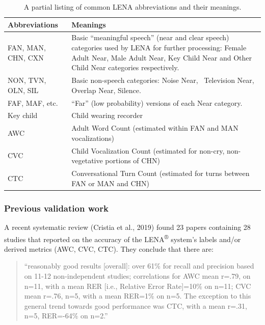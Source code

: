 \documentclass[english,table,man,floatsintext]{apa6}
\begin{document}
\begin{table}

\caption{\label{tab:tab-abb}A partial listing of common LENA abbreviations and their meanings.}
\centering
\begin{tabular}[t]{>{\raggedright\arraybackslash}p{12em}>{\raggedright\arraybackslash}p{28em}}
\toprule
Abbreviations & Meanings\\
\midrule
FAN, MAN, CHN, CXN & Basic “meaningful speech” (near and clear speech) categories used by LENA for further processing: Female Adult Near, Male Adult Near, Key Child Near and Other Child Near categories respectively.\\
NON, TVN, OLN, SIL & Basic non-speech categories: Noise Near,  Television Near, Overlap Near, Silence.\\
FAF, MAF, etc. & “Far” (low probability) versions of each Near category.\\
Key child & Child wearing recorder\\
AWC & Adult Word Count (estimated within FAN and MAN vocalizations)\\
\addlinespace
CVC & Child Vocalization Count (estimated for non-cry, non-vegetative portions of CHN)\\
CTC & Conversational Turn Count (estimated for turns between FAN or MAN and CHN)\\
\bottomrule
\end{tabular}
\end{table}

\hypertarget{previous-validation-work}{%
\subsubsection{Previous validation work}\label{previous-validation-work}}

A recent systematic review (Cristia et al., 2019) found 23 papers containing 28 studies that reported on the accuracy of the LENA\textsuperscript{®} system's labels and/or derived metrics (AWC, CVC, CTC). They conclude that there are:

\begin{quote}
\enquote{reasonably good results {[}overall{]}: over 61\% for recall and precision based on 11-12 non-independent studies; correlations for AWC mean r=.79, on n=11, with a mean RER {[}i.e., Relative Error Rate{]}=10\% on n=11; CVC mean r=.76, n=5, with a mean RER=1\% on n=5. The exception to this general trend towards good performance was CTC, with a mean r=.31, n=5, RER=-64\% on n=2.}
\end{quote}
\end{document}
